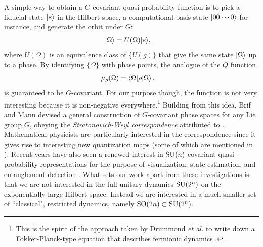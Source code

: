 A simple way to obtain a $G$-covariant quasi-probability function is to pick a fiducial state ${\left\vert{e}\right\rangle}$ in the Hilbert space, a computational basis state ${\left\vert{0 0 \cdots 0 }\right\rangle}$ for instance, and generate the orbit under $G$:
\begin{align}
	{\left\vert{\Omega}\right\rangle} &= U(\Omega) {\left\vert{e}\right\rangle},
\end{align}
where $U(\Omega)$ is an equivalence class of $\{ U(g)\}$ that give the same state ${\left\vert{\Omega}\right\rangle}$ up to a phase. By identifying $\{\Omega\}$ with phase points, the analogue of the $Q$ function
\begin{align}
	\mu_{\rho}(\Omega) &= \braket{\Omega|\rho|\Omega}.
\end{align}
is guaranteed to be $G$-covariant. For our purpose though, the function is not very interesting because it is non-negative everywhere.\footnote{This is the spirit of the approach taken by Drummond \emph{et al.} to write down a Fokker-Planck-type equation that describes fermionic dynamics \cite{corney_gaussian_2006,corney_gaussian_2006-1,rosales-zarate_probabilistic_2015}.} Building from this idea, Brif and Mann \cite{brif_phase-space_1999} devised a general construction of $G$-covariant phase spaces for any Lie group $G$, obeying the \emph{Stratonovich-Weyl correspondence} attributed to \cite{stratonovich_distributions_1957}. Mathematical physicists are particularly interested in the correspondence since it gives rise to interesting new quantization maps (some of which are mentioned in \cite{brif_phase-space_1999}). Recent years have also seen a renewed interest in $\text{SU}(n)$-covariant quasi-probability representations for the purpose of visualization, state estimation, and entanglement detection \cite{klimov_general_2010,tilma_sun-symmetric_2012,rios_symbol_2014,tilma_wigner_2016,rundle_simple_2017}. What sets our work apart from these investigations is that we are not interested in the full unitary dynamics $\text{SU}(2^n)$ on the exponentially large Hilbert space. Instead we are interested in a much smaller set of ``classical", restricted dynamics, namely $\text{SO}(2n) \subset \text{SU}(2^n)$.



